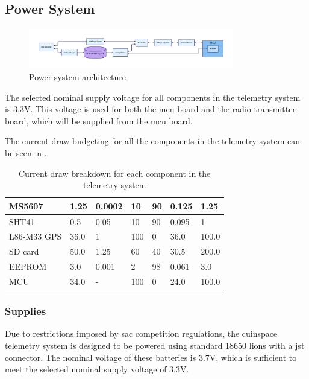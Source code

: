 \subsection{Power System}

\begin{figure}
    \centering
    \includegraphics[width=0.8\textwidth]{assets/diagrams/power_system.png}
    \caption{Power system architecture}
    \label{fig:power-system}
\end{figure}

The selected nominal supply voltage for all components in the telemetry system is 3.3V. This voltage is used for both
the \gls{mcu} board and the radio transmitter board, which will be supplied from the \gls{mcu} board.

The current draw budgeting for all the components in the telemetry system can be seen in .

\begin{table}[H]
    \centering
    \caption{Current draw breakdown for each component in the telemetry system}
    \label{tbl:draw}
    \begin{tabular}{p{0.8in} p{0.5in} p{0.5in} p{0.5in} p{0.5in} p{0.5in} p{0.5in}}
        \hline
        MS5607 & 1.25 & 0.0002 & 10 & 90 & 0.125 & 1.25 \\
        \hline
        SHT41 & 0.5 & 0.05 & 10 & 90 & 0.095 & 1 \\
        \hline
        L86-M33 GPS & 36.0 & 1 & 100 & 0 & 36.0 & 100.0 \\
        \hline
        SD card & 50.0 & 1.25 & 60 & 40 & 30.5 & 200.0 \\
        \hline
        EEPROM & 3.0 & 0.001 & 2 & 98 & 0.061 & 3.0 \\
        \hline
        MCU & 34.0 & - & 100 & 0 & 24.0 & 100.0 \\
        \bottomrule
    \end{tabular}
\end{table}

\subsubsection{Supplies}

Due to restrictions imposed by \gls{sac} competition regulations, the \gls{cuinspace} telemetry system is designed to
be powered using standard 18650 \glspl{lion} with a \gls{jst} connector. The nominal voltage of these batteries is
3.7V, which is sufficient to meet the selected nominal supply voltage of 3.3V.

